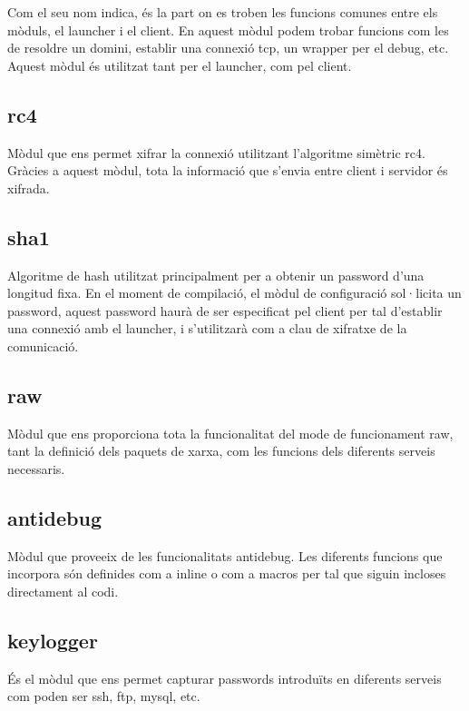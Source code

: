 Com el seu nom indica, és la part on es troben les funcions comunes entre els mòduls, el launcher 
i el client. En aquest mòdul podem trobar funcions com les de resoldre un domini, establir una connexió
tcp, un wrapper per el debug, etc. \\

Aquest mòdul és utilitzat tant per el launcher, com pel client.
\subsection{rc4}

Mòdul que ens permet xifrar la connexió utilitzant l'algoritme simètric rc4. Gràcies a aquest mòdul,
tota la informació que s'envia entre client i servidor és xifrada. 

\subsection{sha1}

Algoritme de hash utilitzat principalment per a obtenir un password d'una longitud fixa. En el moment
de compilació, el mòdul de configuració sol·licita un password, aquest password haurà de ser especificat
pel client per tal d'establir una connexió amb el launcher, i s'utilitzarà com a clau de xifratxe
de la comunicació.

\subsection{raw}

Mòdul que ens proporciona tota la funcionalitat del mode de funcionament raw, tant la definició dels
paquets de xarxa, com les funcions dels diferents serveis necessaris.

\subsection{antidebug}

Mòdul que proveeix de les funcionalitats antidebug. Les diferents funcions que incorpora són definides
com a inline o com a macros per tal que siguin incloses directament al codi.

\subsection{keylogger}

És el mòdul que ens permet capturar passwords introduïts en diferents serveis com poden ser ssh, ftp, mysql, etc.
